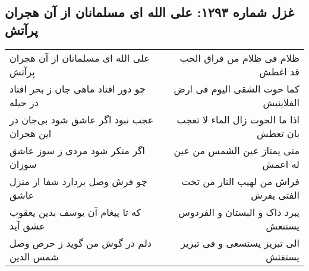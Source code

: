 \begin{center}
\section*{غزل شماره ۱۲۹۳: علی الله ای مسلمانان از آن هجران پرآتش}
\label{sec:1293}
\begin{longtable}{l p{0.5cm} r}
علی الله ای مسلمانان از آن هجران پرآتش
&&
ظلام فی ظلام من فراق الحب قد اغطش
\\
چو دور افتاد ماهی جان ز بحر افتاد در حیله
&&
کما حوت الشقی الیوم فی ارض الفلاینبش
\\
عجب نبود اگر عاشق شود بی‌جان در این هجران
&&
اذا ما الحوت زال الماء لا تعجب بان تعطش
\\
اگر منکر شود مردی ز سوز عاشق سوزان
&&
متی یمتاز عین الشمس من عین له اعمش
\\
چو فرش وصل بردارد شفا از منزل عاشق
&&
فراش من لهیب النار من تحت الفتی یفرش
\\
که تا پیغام آن یوسف بدین یعقوب عشق آید
&&
یبرد ذاک و البستان و الفردوس یستنعش
\\
دلم در گوش من گوید ز حرص وصل شمس الدین
&&
الی تبریز یستسعی و فی تبریز یستفتش
\\
\end{longtable}
\end{center}
